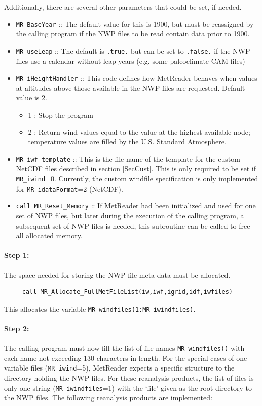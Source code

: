 \documentclass[11pt]{article}   %
\begin{document}
Additionally, there are several other parameters that could be set, if needed.
\begin{itemize}
\item \texttt{MR\_BaseYear} :: The default value for this is 1900, but must be
reassigned by the calling program if the NWP files to be read contain data prior to 1900.
\item \texttt{MR\_useLeap} :: The default is \texttt{.true.} but can be set to \texttt{.false.}
if the NWP files use a calendar without leap years (e.g. some paleoclimate CAM files)
\item \texttt{MR\_iHeightHandler} :: This code defines how MetReader behaves when values at
altitudes above those available in the NWP files are requested.  Default value is 2.
 \begin{itemize}
 \item   1 : Stop the program
 \item   2 : Return wind values equal to the value at the highest available node; temperature
values are filled by the U.S. Standard Atmosphere.
 \end{itemize}
\item \texttt{MR\_iwf\_template} :: This is the file name of the template for the
custom NetCDF files described in section \ref{SecCust}.  This is only required to be set
if \texttt{MR\_iwind}=0.  Currently, the custom windfile specification is only implemented for
\texttt{MR\_idataFormat}=2 (NetCDF).
\item \texttt{call MR\_Reset\_Memory} :: If MetReader had been initialized and used for
one set of NWP files, but later during the execution of the calling program, a subsequent
set of NWP files is needed, this subroutine can be called to free all allocated memory.
\end{itemize}

\paragraph{Step 1:} The space needed for storing the NWP file meta-data must be allocated.
\begin{verbatim}
     call MR_Allocate_FullMetFileList(iw,iwf,igrid,idf,iwfiles)
\end{verbatim}
This allocates the variable \texttt{MR\_windfiles(1:MR\_iwindfiles)}.

\paragraph{Step 2:} The calling program must now fill the list of file names \texttt{MR\_windfiles()}
with each name not exceeding 130 characters in length.  For the special cases of
one-variable files (\texttt{MR\_iwind}=5),
MetReader expects
a specific structure to the directory holding the NWP files.  For these reanalysis products,
the list of files is only one string (\texttt{MR\_iwindfiles}=1)
with the `file' given as the root directory to the NWP files.  The following reanalysis products
are implemented:
\end{document}
